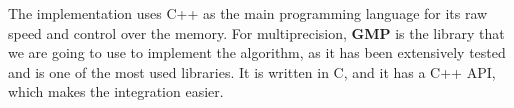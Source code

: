 The implementation uses C++ as the main programming language for its raw speed and control over the memory. For multiprecision, \textbf{GMP} is the library that we are going to use to implement the algorithm, as it has been extensively tested and is one of the most used libraries. It is written in C, and it has a C++ API, which makes the integration easier.

\endinput
